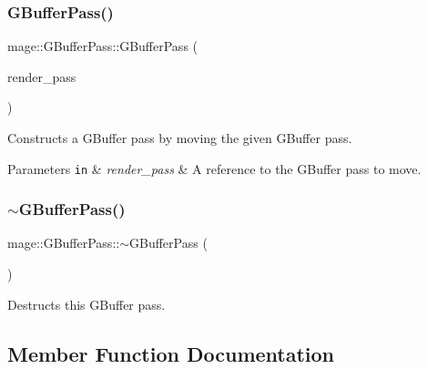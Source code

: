 \subsubsection{\texorpdfstring{G\+Buffer\+Pass()}{GBufferPass()}\hspace{0.1cm}{\footnotesize\ttfamily [3/3]}}
{\footnotesize\ttfamily mage\+::\+G\+Buffer\+Pass\+::\+G\+Buffer\+Pass (\begin{DoxyParamCaption}\item[{\hyperlink{classmage_1_1_g_buffer_pass}{G\+Buffer\+Pass} \&\&}]{render\+\_\+pass }\end{DoxyParamCaption})\hspace{0.3cm}{\ttfamily [default]}}

Constructs a G\+Buffer pass by moving the given G\+Buffer pass.


\begin{DoxyParams}[1]{Parameters}
\mbox{\tt in}  & {\em render\+\_\+pass} & A reference to the G\+Buffer pass to move. \\
\hline
\end{DoxyParams}
\hypertarget{classmage_1_1_g_buffer_pass_a34b2735cfb9b3546c903760f42ff770c}{}\label{classmage_1_1_g_buffer_pass_a34b2735cfb9b3546c903760f42ff770c} 
\subsubsection{\texorpdfstring{$\sim$\+G\+Buffer\+Pass()}{~GBufferPass()}}
{\footnotesize\ttfamily mage\+::\+G\+Buffer\+Pass\+::$\sim$\+G\+Buffer\+Pass (\begin{DoxyParamCaption}{ }\end{DoxyParamCaption})\hspace{0.3cm}{\ttfamily [default]}}

Destructs this G\+Buffer pass. 

\subsection{Member Function Documentation}
\hypertarget{classmage_1_1_g_buffer_pass_a4a13364cc0318417f31df50d7081b0b0}{}\label{classmage_1_1_g_buffer_pass_a4a13364cc0318417f31df50d7081b0b0} 
